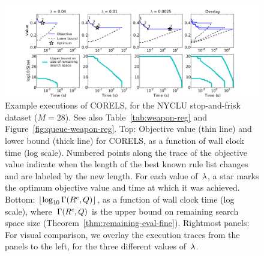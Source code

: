 \begin{figure}[t!]
\begin{center}
\includegraphics[trim={35mm 0mm 35mm 20mm},
width=\textwidth]{figs/weapon_reg-execution.pdf}
\end{center}
\vspace{-5mm}
\caption{Example executions of CORELS, for the NYCLU stop-and-frisk dataset (${M = 28}$).
%
See also Table~\ref{tab:weapon-reg} and Figure~\ref{fig:queue-weapon-reg}.
%
Top: Objective value (thin line) and lower bound (thick line) for CORELS,
as a function of wall clock time (log scale).
%
Numbered points along the trace of the objective value
indicate when the length of the best known rule list changes
and are labeled by the new length.
%
For each value of~${\lambda}$, a star marks the optimum objective value
and time at which it was achieved.
%
Bottom: $\lfloor \log_{10} \Gamma({R^c}, Q) \rfloor$,
as a function of wall clock time (log scale),
where~$\Gamma({R^c}, Q)$
is the upper bound on remaining search space size
(Theorem~\ref{thm:remaining-eval-fine}).
%
Rightmost panels: For visual comparison, we overlay the execution traces
from the panels to the left, for the three different values of~${\lambda}$.
}
\label{fig:weapon-reg-execution}
\end{figure}

